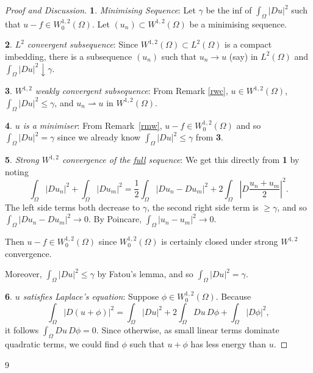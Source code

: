 \documentclass[a4paper]{amsart}
\theoremstyle{plain}
\theoremstyle{definition}
\theoremstyle{remark}
\begin{document}
\begin{proof}[Proof and Discussion] \mbox{}

\textbf{1}.  \emph{Minimising Sequence}:  Let $ \gamma $ be the inf of $ \int_\Omega |Du|^2 $ such that $ u-f \in W_0^{1,2}(\Omega) $.  Let $ (u_n )\subset  W^{1,2}(\Omega)$ be a minimising sequence.

\medskip \textbf{2}.  \emph{$ L^2 $ convergent subsequence}:  Since $ W^{1,2}(\Omega) \subset L^2(\Omega ) $ is a compact imbedding, there is a subsequence $ (u_n) $ such that $ u_n \to u $ (say) in $ L^2 (\Omega)$ and $ \int_\Omega |Du|^2 \downarrow \gamma $.

\medskip \textbf{3}.  \emph{$ W^{1,2} $ weakly convergent subsequence}:  
From Remark \ref{rwc}, $ u \in W^{1,2}(\Omega)$, $ \int_\Omega |Du|^2 \leq \gamma $, and $ u_n \rightharpoonup u $ in $ W^{1,2} (\Omega)$. 

\medskip \textbf{4}. \emph{$ u $ is a minimiser}:  From Remark~\ref{rmw}, $ u-f \in W_0^{1,2}(\Omega) $ and so $ \int_\Omega |Du|^2 = \gamma $
since we already know $ \int_\Omega |Du|^2 \leq \gamma $ from \textbf{3}.

\medskip \textbf{5}. \emph{Strong $ W^{1,2} $ convergence of the \underline{full} sequence}:  We   get this directly from \textbf{1}   by noting
\[
\int_\Omega |Du_n|^2 + \int_\Omega |Du_m|^2 = \frac{1}{2} \int_\Omega |Du_n - Du_m|^2 + 2 \int_\Omega \left|D \frac{u_n+u_m}{2}\right|^2.
\]
The left side terms both decrease to $ \gamma $,    the second right side term is $ \geq \gamma $, and so $ \int_\Omega |Du_n - Du_m|^2 \to 0  $. 
By Poincare, $ \int_\Omega | u_n -  u_m|^2 \to 0 $.  

Then $ u-f \in W_0^{1,2}(\Omega) $ since $ W_0^{1,2}(\Omega) $ is certainly closed under strong $  W ^{1,2}$ convergence.

Moreover, $ \int_\Omega |Du|^2 \leq \gamma $ by Fatou's lemma, and so $ \int_\Omega |Du|^2= \gamma $.

\medskip \textbf{6}. \emph{$ u $ satisfies Laplace's equation}:     Suppose $ \phi \in W_0^{1,2}(\Omega)$.  Because
\[
\int_\Omega |D(u+\phi)|^2 = \int_\Omega |Du|^2 + 2 \int_\Omega Du\,  D\phi + \int_\Omega |D\phi|^2,
\]
it follows $\int_\Omega Du\, D\phi = 0 $.  Since otherwise, as small linear terms dominate  quadratic terms, we could find $ \phi $ such that $ u+\phi $ has less energy than $ u $. 
\end{proof} 




\begin{thebibliography}{9} 


\end{thebibliography}
\end{document}
